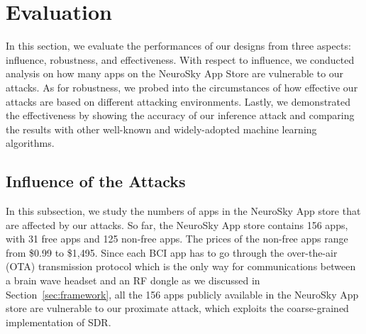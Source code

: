 \section{Evaluation}
\label{sec:performance}

In this section, we evaluate the performances of our designs from three aspects: influence, robustness, and effectiveness. With respect to influence, we conducted analysis on how many apps on the NeuroSky App Store are vulnerable to our attacks. As for robustness, we probed into the circumstances of how effective our attacks are based on different attacking environments. Lastly, we demonstrated the effectiveness by showing the accuracy of our inference attack and comparing the results with other well-known and widely-adopted machine learning algorithms.

\subsection{Influence of the Attacks}
In this subsection, we study the numbers of apps in the NeuroSky App store that are affected by our attacks. So far, the NeuroSky App store contains 156 apps, with 31 free apps and 125 non-free apps. The prices of the non-free apps range from \$0.99 to \$1,495. Since each BCI app has to go through the over-the-air (OTA) transmission protocol which is the only way for communications between a brain wave headset and an RF dongle as we discussed in Section~\ref{sec:framework}, all the 156 apps publicly available in the NeuroSky App store are vulnerable to our proximate attack, which exploits the coarse-grained implementation of SDR.\\
%
